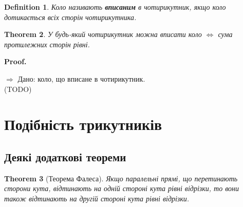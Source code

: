 \documentclass[a4paper, 10pt]{article}
\makeatletter
\def\rightproof{$\boxed{\Rightarrow}$ }
\def\qed{$\blacksquare$}
\theoremstyle{theoremdd}
\newtheorem{theorem}{Theorem}[subsection]
\theoremstyle{theoremdd}
\theoremstyle{theoremdd}
\newtheorem{definition}[theorem]{Definition}
\theoremstyle{theoremdd}
\theoremstyle{theoremdd}
\theoremstyle{theoremdd}
\theoremstyle{theoremdd}
\theoremstyle{theoremdd}
\theoremstyle{theoremdd}
\renewenvironment{proof}[1][Proof.\\]{\par
\pushQED{\hfill \qed}%
\normalfont \topsep6\p@\@plus6\p@\relax
\trivlist
\item\relax
{\bfseries
#1\@addpunct{.}}\hspace\labelsep\ignorespaces
}{%
\popQED\endtrivlist\@endpefalse
}
\makeatother
\begin{document}
\begin{definition}
Коло називають \textbf{вписаним} в чотирикутник, якщо коло дотикається всіх сторін чотирикутника.
\end{definition}

\begin{theorem}
У будь-який чотирикутник можна вписати коло $\iff$ сума протилежних сторін рівні.
\end{theorem}

\begin{proof}
\rightproof Дано: коло, що вписане в чотирикутник.\\
(TODO)
\end{proof}
\newpage

\section{Подібність трикутників}
\subsection{Деякі додаткові теореми}
\begin{theorem}[Теорема Фалеса]
Якщо паралельні прямі, що перетинають сторони кута, відтинають на одній стороні кута рівні відрізки, то вони також відтинають на другій стороні кута рівні відрізки.
\end{theorem}
\end{document}
